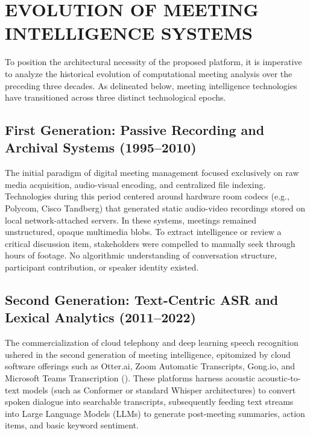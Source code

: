 \documentclass[12pt,a4paper,oneside]{report}
\providecommand{\parencite}[1]{(\cite{#1})}
\begin{document}
\section{EVOLUTION OF MEETING INTELLIGENCE SYSTEMS}
To position the architectural necessity of the proposed platform, it is imperative to analyze the historical evolution of computational meeting analysis over the preceding three decades. As delineated below, meeting intelligence technologies have transitioned across three distinct technological epochs.

\subsection{First Generation: Passive Recording and Archival Systems (1995--2010)}
The initial paradigm of digital meeting management focused exclusively on raw media acquisition, audio-visual encoding, and centralized file indexing. Technologies during this period centered around hardware room codecs (e.g., Polycom, Cisco Tandberg) that generated static audio-video recordings stored on local network-attached servers. In these systems, meetings remained unstructured, opaque multimedia blobs. To extract intelligence or review a critical discussion item, stakeholders were compelled to manually seek through hours of footage. No algorithmic understanding of conversation structure, participant contribution, or speaker identity existed.

\subsection{Second Generation: Text-Centric ASR and Lexical Analytics (2011--2022)}
The commercialization of cloud telephony and deep learning speech recognition ushered in the second generation of meeting intelligence, epitomized by cloud software offerings such as Otter.ai, Zoom Automatic Transcripts, Gong.io, and Microsoft Teams Transcription \parencite{gong2021revenue, blanco2020meeting}. These platforms harness acoustic acoustic-to-text models (such as Conformer or standard Whisper architectures) to convert spoken dialogue into searchable transcripts, subsequently feeding text streams into Large Language Models (LLMs) to generate post-meeting summaries, action items, and basic keyword sentiment.
\end{document}

